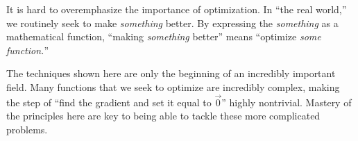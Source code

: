 It is hard to overemphasize the importance of optimization. In ``the real world,'' we routinely seek to make \emph{something} better. By expressing the \emph{something} as a mathematical function, ``making \emph{something} better'' means ``optimize \emph{some function.}'' 

The techniques shown here are only the beginning of an incredibly important field. Many functions that we seek to optimize are incredibly complex, making the step of ``find the gradient and set it equal to $\vec 0$'' highly nontrivial. Mastery of the principles here are key to being able to tackle these more complicated problems.

